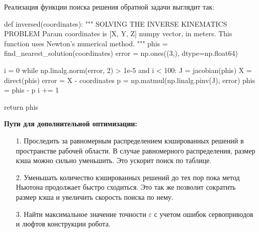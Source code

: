 \noindent Реализация функции поиска решения обратной задачи выглядит так:
\begin{python}
def inversed(coordinates):
    """ 
    SOLVING THE INVERSE KINEMATICS PROBLEM \n
    Param coordinates is [X, Y, Z] numpy vector, in meters.
    This function uses Newton's numerical method.
    """
    phis = find_nearest_solution(coordinates)
    error = np.ones((3,), dtype=np.float64)

    i = 0
    while np.linalg.norm(error, 2) > 1e-5 and i < 100:
        J = jacobian(phis)
        X = direct(phis)
        error = X - coordinates
        p = np.matmul(np.linalg.pinv(J), error)
        phis = phis - p
        i += 1
    
    return phis
\end{python}

\textbf{Пути для дополнительной оптимизации:}
\begin{itemize}
    \item[1.] Проследить за равномерным распределением кэшированных решений в пространстве рабочей области. В случае равномерного распределения, размер кэша можно сильно уменьшить. Это ускорит поиск по таблице.
    \item[2.] Уменьшать количество кэшированных решений до тех пор пока метод Ньютона продолжает быстро сходиться. Это так же позволит сократить размер кэша и увеличить скорость поиска по нему.
    \item[3.] Найти максимальное значение точности $ \varepsilon $ с учетом ошибок сервоприводов и люфтов конструкции робота. 
\end{itemize}

